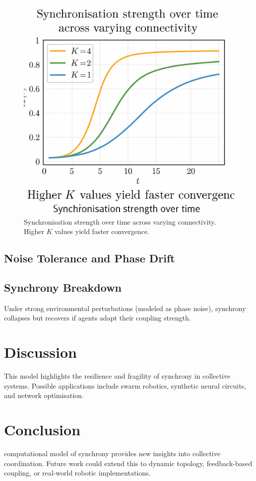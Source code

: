 \documentclass{manuscript_modern}
\begin{document}
\begin{maintext}
		\begin{figure}[ht]
			\centering
			\includegraphics[width=0.7\linewidth]{sync_plot}
			\caption{Synchronisation strength over time across varying connectivity. Higher $K$ values yield faster convergence.}
			\label{fig:sync_plot}
		\end{figure}
		
		\subsection{Noise Tolerance and Phase Drift}
		\lipsum[5]
		
		\subsection{Synchrony Breakdown}
		Under strong environmental perturbations (modeled as phase noise), synchrony collapses but recovers if agents adapt their coupling strength.
		
		\section{Discussion}
		\lipsum[6-7]
		
		This model highlights the resilience and fragility of synchrony \cite{grinsteinSteeredResponsePower2024, jensArrayvolutionUsingMicrophone, nehoraiAcousticVectorsensorArray1994, spiesbergerHyperbolicLocationErrors2001b, wajidDesignAnalysisAir2016} in collective systems. Possible applications include swarm robotics, synthetic neural circuits, and network optimisation.
		
		\section{Conclusion}
		\Our{} computational model of synchrony provides new insights into collective coordination. Future work could extend this to dynamic topology, feedback-based coupling, or real-world robotic implementations.
		
	\end{maintext}
	
	\greyhrule
	\begin{manuscriptinfo}
	\end{manuscriptinfo}
	
	\greyhrule
	\printbibliography
	
\end{document}

